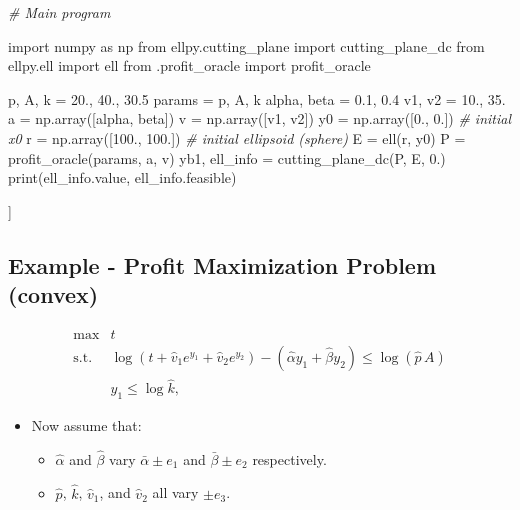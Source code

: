 \documentclass[
]{article}
\newenvironment{Shaded}{}{}
\newcommand{\BuiltInTok}[1]{#1}
\newcommand{\CommentTok}[1]{\textcolor[rgb]{0.38,0.63,0.69}{\textit{#1}}}
\newcommand{\FloatTok}[1]{\textcolor[rgb]{0.25,0.63,0.44}{#1}}
\newcommand{\ImportTok}[1]{#1}
\newcommand{\NormalTok}[1]{#1}
\newcommand{\OperatorTok}[1]{\textcolor[rgb]{0.40,0.40,0.40}{#1}}
\providecommand{\tightlist}{%
  \setlength{\itemsep}{0pt}\setlength{\parskip}{0pt}}
\begin{document}
\begin{Shaded}
\begin{Highlighting}[]
\CommentTok{\# Main program}

\ImportTok{import}\NormalTok{ numpy }\ImportTok{as}\NormalTok{ np}
\ImportTok{from}\NormalTok{ ellpy.cutting\_plane }\ImportTok{import}\NormalTok{ cutting\_plane\_dc}
\ImportTok{from}\NormalTok{ ellpy.ell }\ImportTok{import}\NormalTok{ ell}
\ImportTok{from}\NormalTok{ .profit\_oracle }\ImportTok{import}\NormalTok{ profit\_oracle}

\NormalTok{p, A, k }\OperatorTok{=} \FloatTok{20.}\NormalTok{, }\FloatTok{40.}\NormalTok{, }\FloatTok{30.5}
\NormalTok{params }\OperatorTok{=}\NormalTok{ p, A, k}
\NormalTok{alpha, beta }\OperatorTok{=} \FloatTok{0.1}\NormalTok{, }\FloatTok{0.4}
\NormalTok{v1, v2 }\OperatorTok{=} \FloatTok{10.}\NormalTok{, }\FloatTok{35.}
\NormalTok{a }\OperatorTok{=}\NormalTok{ np.array([alpha, beta])}
\NormalTok{v }\OperatorTok{=}\NormalTok{ np.array([v1, v2])}
\NormalTok{y0 }\OperatorTok{=}\NormalTok{ np.array([}\FloatTok{0.}\NormalTok{, }\FloatTok{0.}\NormalTok{])  }\CommentTok{\# initial x0}
\NormalTok{r }\OperatorTok{=}\NormalTok{ np.array([}\FloatTok{100.}\NormalTok{, }\FloatTok{100.}\NormalTok{])  }\CommentTok{\# initial ellipsoid (sphere)}
\NormalTok{E }\OperatorTok{=}\NormalTok{ ell(r, y0)}
\NormalTok{P }\OperatorTok{=}\NormalTok{ profit\_oracle(params, a, v)}
\NormalTok{yb1, ell\_info }\OperatorTok{=}\NormalTok{ cutting\_plane\_dc(P, E, }\FloatTok{0.}\NormalTok{)}
\BuiltInTok{print}\NormalTok{(ell\_info.value, ell\_info.feasible)}
\end{Highlighting}
\end{Shaded}

{]}

\hypertarget{example---profit-maximization-problem-convex}{%
\subsection{Example - Profit Maximization Problem (convex)}\label{example---profit-maximization-problem-convex}}

\[\begin{array}{ll}
\text{max}  & t \\
\text{s.t.} & \log(t + \hat{v}_1 e^{y_1} + \hat{v}_2 e^{y_2}) - (\hat{\alpha} y_1 + \hat{\beta} y_2) \le \log(\hat{p}\,A)  \\
                  & y_1 \le \log \hat{k} ,
\end{array}\]

\begin{itemize}
\tightlist
\item
  Now assume that:

  \begin{itemize}
  \tightlist
  \item
    \(\hat{\alpha}\) and \(\hat{\beta}\) vary \(\bar{\alpha} \pm e_1\) and
    \(\bar{\beta} \pm e_2\) respectively.
  \item
    \(\hat{p}\), \(\hat{k}\), \(\hat{v}_1\), and \(\hat{v}_2\) all vary
    \(\pm e_3\).
  \end{itemize}
\end{itemize}
\end{document}
